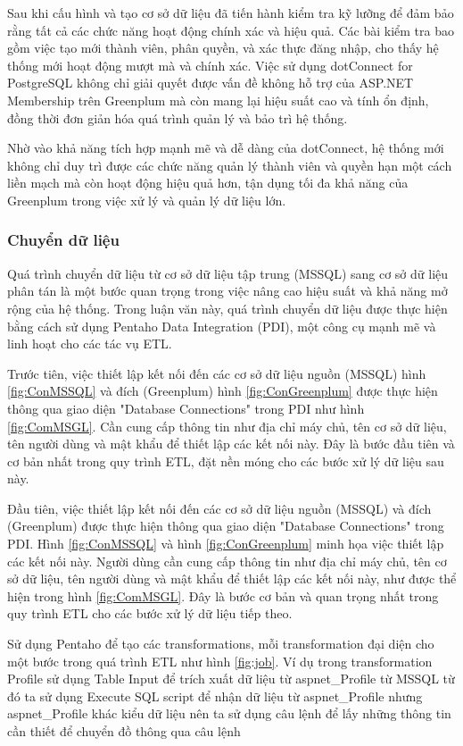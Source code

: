 \documentclass[14pt]{article}
\begin{document}
Sau khi cấu hình và tạo cơ sở dữ liệu đã tiến hành kiểm tra kỹ lưỡng để đảm bảo rằng tất cả các chức năng hoạt động chính xác và hiệu quả. Các bài kiểm tra bao gồm việc tạo mới thành viên, phân quyền, và xác thực đăng nhập, cho thấy hệ thống mới hoạt động mượt mà và chính xác. Việc sử dụng dotConnect for PostgreSQL không chỉ giải quyết được vấn đề không hỗ trợ của ASP.NET Membership trên Greenplum mà còn mang lại hiệu suất cao và tính ổn định, đồng thời đơn giản hóa quá trình quản lý và bảo trì hệ thống.

Nhờ vào khả năng tích hợp mạnh mẽ và dễ dàng của dotConnect, hệ thống mới không chỉ duy trì được các chức năng quản lý thành viên và quyền hạn một cách liền mạch mà còn hoạt động hiệu quả hơn, tận dụng tối đa khả năng của Greenplum trong việc xử lý và quản lý dữ liệu lớn.

\subsubsection{Chuyển dữ liệu}

Quá trình chuyển dữ liệu từ cơ sở dữ liệu tập trung (MSSQL) sang cơ sở dữ liệu phân tán là một bước quan trọng trong việc nâng cao hiệu suất và khả năng mở rộng của hệ thống. Trong luận văn này, quá trình chuyển dữ liệu được thực hiện bằng cách sử dụng Pentaho Data Integration (PDI), một công cụ mạnh mẽ và linh hoạt cho các tác vụ ETL.

Trước tiên, việc thiết lập kết nối đến các cơ sở dữ liệu nguồn (MSSQL) hình \ref{fig:ConMSSQL} và đích (Greenplum) hình \ref{fig:ConGreenplum}  được thực hiện thông qua giao diện "Database Connections" trong PDI như hình \ref{fig:ComMSGL}. Cần cung cấp thông tin như địa chỉ máy chủ, tên cơ sở dữ liệu, tên người dùng và mật khẩu để thiết lập các kết nối này. Đây là bước đầu tiên và cơ bản nhất trong quy trình ETL, đặt nền móng cho các bước xử lý dữ liệu sau này.

Đầu tiên, việc thiết lập kết nối đến các cơ sở dữ liệu nguồn (MSSQL) và đích (Greenplum) được thực hiện thông qua giao diện "Database Connections" trong PDI. Hình \ref{fig:ConMSSQL} và hình \ref{fig:ConGreenplum} minh họa việc thiết lập các kết nối này. Người dùng cần cung cấp thông tin như địa chỉ máy chủ, tên cơ sở dữ liệu, tên người dùng và mật khẩu để thiết lập các kết nối này, như được thể hiện trong hình \ref{fig:ComMSGL}. Đây là bước cơ bản và quan trọng nhất trong quy trình ETL cho các bước xử lý dữ liệu tiếp theo.

Sử dụng Pentaho để tạo các transformations, mỗi transformation đại diện cho một bước trong quá trình ETL như hình \ref{fig:job}. Ví dụ trong transformation Profile sử dụng Table Input để trích xuất dữ liệu từ aspnet\_Profile từ MSSQL từ đó ta sử dụng Execute SQL script để nhận dữ liệu từ aspnet\_Profile nhưng aspnet\_Profile khác kiểu dữ liệu nên ta sử dụng câu lệnh để lấy những thông tin cần thiết để chuyển đồ thông qua câu lệnh
\end{document}
